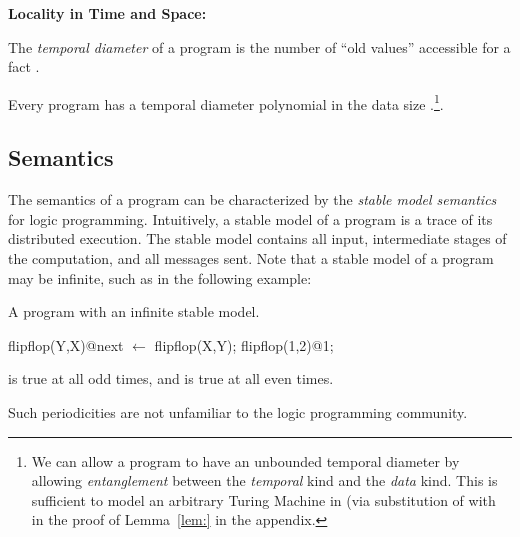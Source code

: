 {\bf Locality in Time and Space:}
\begin{definition}
The {\em temporal diameter} of a \lang program is the number of ``old values'' accessible for a fact .
\end{definition}

Every \lang program has a temporal diameter polynomial in the data size .\footnote{We can allow a program to have an unbounded temporal diameter by allowing {\em entanglement} between the {\em temporal} kind and the {\em data} kind.  This is sufficient to model an arbitrary Turing Machine in \lang (via substitution of  with  in the proof of Lemma~\ref{lem:} in the appendix.}.


%

\subsection{Semantics}
The semantics of a \lang program can be characterized by the {\em stable model semantics}~\cite{stable-model} for logic programming.  Intuitively, a stable model of a \lang program is a trace of its  distributed execution.  The stable model contains all input, intermediate stages of the computation, and all messages sent.  Note that a stable model of a \lang program may be infinite, such as in the following example:

\begin{example}
\label{ex:flipflop}
A \lang program with an infinite stable model.

\begin{Dedalus}
flipflop(Y,X)@next \(\leftarrow\) flipflop(X,Y);
flipflop(1,2)@1;
\end{Dedalus}
\end{example}

 is true at all odd times, and  is true at all even times.

Such periodicities are not unfamiliar to the logic programming community.  

